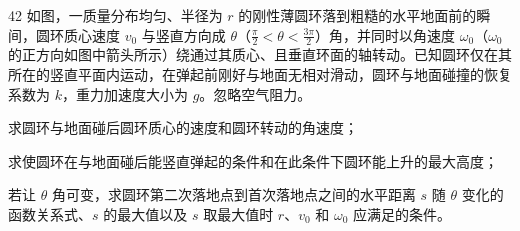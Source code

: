\begin{problem}[第32届全国中学生物理竞赛复赛][圆环碰撞与斜抛运动]{42}
    如图，一质量分布均匀、半径为 $r$ 的刚性薄圆环落到粗糙的水平地面前的瞬间，圆环质心速度 $v_{0}$ 与竖直方向成 $\theta$（$\frac{\pi}{2} < \theta < \frac{3\pi}{2}$）角，并同时以角速度 $\omega_{0}$（$\omega_{0}$ 的正方向如图中箭头所示）绕通过其质心、且垂直环面的轴转动。已知圆环仅在其所在的竖直平面内运动，在弹起前刚好与地面无相对滑动，圆环与地面碰撞的恢复系数为 $k$，重力加速度大小为 $g$。忽略空气阻力。
    \begin{subproblem}
        求圆环与地面碰后圆环质心的速度和圆环转动的角速度；
    \end{subproblem}
    \begin{subproblem}
        求使圆环在与地面碰后能竖直弹起的条件和在此条件下圆环能上升的最大高度；
    \end{subproblem}
    \begin{subproblem}
        若让 $\theta$ 角可变，求圆环第二次落地点到首次落地点之间的水平距离 $s$ 随 $\theta$ 变化的函数关系式、$s$ 的最大值以及 $s$ 取最大值时 $r$、$v_{0}$ 和 $\omega_{0}$ 应满足的条件。
    \end{subproblem}
\end{problem}